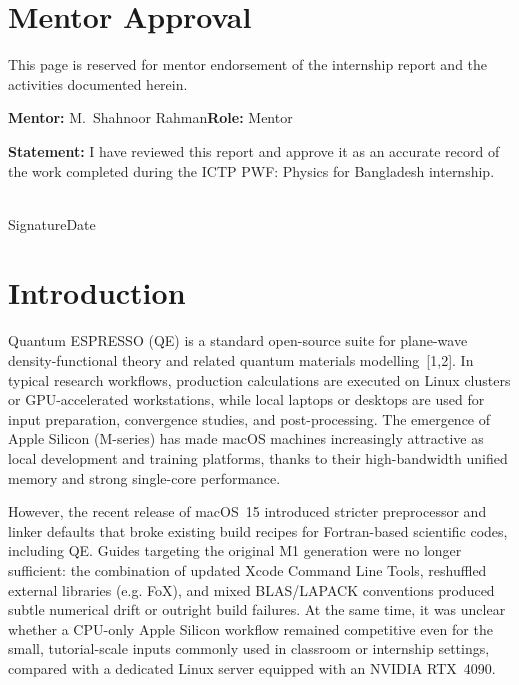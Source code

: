 \documentclass[12pt]{article}
\begin{document}
\newpage
\section*{Mentor Approval}
\thispagestyle{plain}
This page is reserved for mentor endorsement of the internship report and the activities documented herein.

\vspace{1.5em}
\noindent\textbf{Mentor:} M.~Shahnoor Rahman\hfill\textbf{Role:} Mentor

\vspace{1.5em}
\noindent\textbf{Statement:} I have reviewed this report and approve it as an accurate record of the work completed during the ICTP PWF: Physics for Bangladesh internship.

\vspace{3em}
\noindent\makebox[0.45\linewidth]{\rule{0.45\linewidth}{0.4pt}}\hfill\makebox[0.3\linewidth]{\rule{0.3\linewidth}{0.4pt}}\\[-0.2em]
\noindent\hspace{1.5em}Signature\hfill Date

\newpage

\tableofcontents
\newpage


\section{Introduction}
Quantum ESPRESSO (QE) is a standard open-source suite for plane-wave density-functional theory and related quantum materials modelling~[1,2]. In typical research workflows, production calculations are executed on Linux clusters or GPU-accelerated workstations, while local laptops or desktops are used for input preparation, convergence studies, and post-processing. The emergence of Apple Silicon (M-series) has made macOS machines increasingly attractive as local development and training platforms, thanks to their high-bandwidth unified memory and strong single-core performance.

However, the recent release of macOS~15 introduced stricter preprocessor and linker defaults that broke existing build recipes for Fortran-based scientific codes, including QE. Guides targeting the original M1 generation were no longer sufficient: the combination of updated Xcode Command Line Tools, reshuffled external libraries (e.g. FoX), and mixed BLAS/LAPACK conventions produced subtle numerical drift or outright build failures. At the same time, it was unclear whether a CPU-only Apple Silicon workflow remained competitive even for the small, tutorial-scale inputs commonly used in classroom or internship settings, compared with a dedicated Linux server equipped with an NVIDIA RTX~4090.
\end{document}
